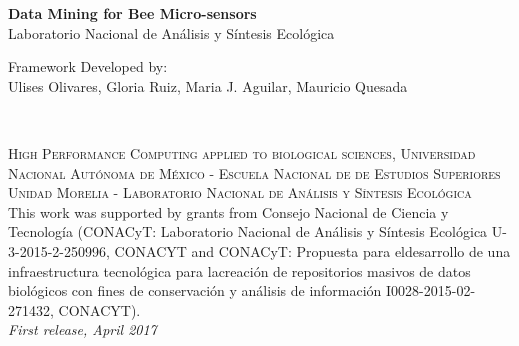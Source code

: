 \documentclass[11pt,fleqn]{book} %
\begin{document}

\begingroup
\thispagestyle{empty}
\centering
\vspace*{4cm}
\par\normalfont\fontsize{35}{35}\sffamily\selectfont
\textbf{\color{white}Data Mining for Bee Micro-sensors}\\
{\Huge\color{white} Laboratorio Nacional de Análisis y Síntesis Ecológica}\par %
\vspace*{0.2cm}
{\LARGE\color{white} Framework Developed by:\\ Ulises Olivares, Gloria Ruiz, Maria J. Aguilar,  Mauricio Quesada }\par 
\endgroup


\newpage
~\vfill
\thispagestyle{empty}


\noindent \textsc{High Performance Computing applied to biological sciences, Universidad Nacional Autónoma de México - Escuela Nacional de de Estudios Superiores Unidad Morelia - Laboratorio Nacional de Análisis y Síntesis Ecológica }\\

\noindent  This work was supported by grants from Consejo Nacional de Ciencia y Tecnología (CONACyT: Laboratorio Nacional de Análisis y Síntesis Ecológica U-3-2015-2-250996, CONACYT and CONACyT: Propuesta para eldesarrollo de una infraestructura tecnológica para lacreación de repositorios masivos de datos biológicos con fines de conservación y análisis de información I0028-2015-02-271432, CONACYT).\\ %

\noindent \textit{First release, April 2017} %
\end{document}
